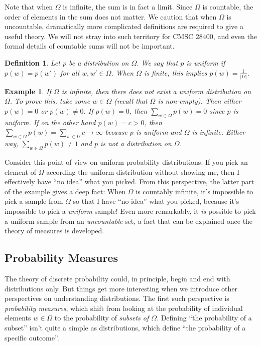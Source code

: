 \documentclass[11pt]{article}
\newtheorem{definition}{Definition}
\newtheorem{example}{Example}
\begin{document}
Note that when $\Omega$ is infinite, the sum is in fact a limit. Since $\Omega$
is countable, the order of elements in the sum does not matter.   We caution
that when $\Omega$ is uncountable, dramatically more complicated definitions
are required to give a useful theory. We will not stray into such territory for
CMSC 28400, and even the formal details of countable sums will not be important.

\begin{definition}
    Let $p$ be a distribution on $\Omega$. We say that $p$ is
    \emph{uniform} if $p(w) = p(w')$ for all $w,w'\in\Omega$.  When
    $\Omega$ is finite, this implies $p(w) = \frac{1}{|\Omega|}$.
\end{definition}

\begin{example}
    If $\Omega$ is infinite, then there does not exist a uniform distribution on
    $\Omega$. To prove this, take some $w\in\Omega$ (recall that $\Omega$ is
    non-empty). Then either $p(w)=0$ or $p(w)\neq 0$. If $p(w)=0$,
    then $\sum_{w\in\Omega} p(w) = 0$ since $p$ is uniform. If on the other
    hand
    $p(w)=c>0$, then $\sum_{w\in\Omega} p(w) =\sum_{w\in\Omega}
    c\rightarrow \infty$ because $p$ is uniform and $\Omega$ is infinite.
    Either way, $\sum_{w\in\Omega}p(w) \neq 1$ and $p$ is not a distribution on
    $\Omega$. 
\end{example}
Consider this point of view on uniform probability distributions: If you pick
an element of $\Omega$ according the uniform distribution without showing me,
then I effectively have ``no idea'' what you picked.  From this perspective,
the latter part of the example gives a deep fact: When $\Omega$ is countably 
infinite, it's impossible to pick a
sample from $\Omega$ so that I have ``no idea'' what you picked, because it's
impossible to pick a \emph{uniform} sample! Even more remarkably, it \emph{is}
possible to pick a uniform sample from an \emph{uncountable} set, a fact that
can be explained once the theory of measures is developed.

\subsection{Probability Measures}

The theory of discrete probability could, in principle, begin and end with
distributions only. But things get more interesting when we introduce other
perspectives on understanding distributions. The first such perspective is
\emph{probability measures}, which shift from looking at the probability of
individual elements $w\in\Omega$ to the probability of \emph{subsets of
$\Omega$}.  Defining ``the probability of a subset'' isn't quite a simple as
distributions, which define ``the probability of a specific outcome''.
\end{document}
